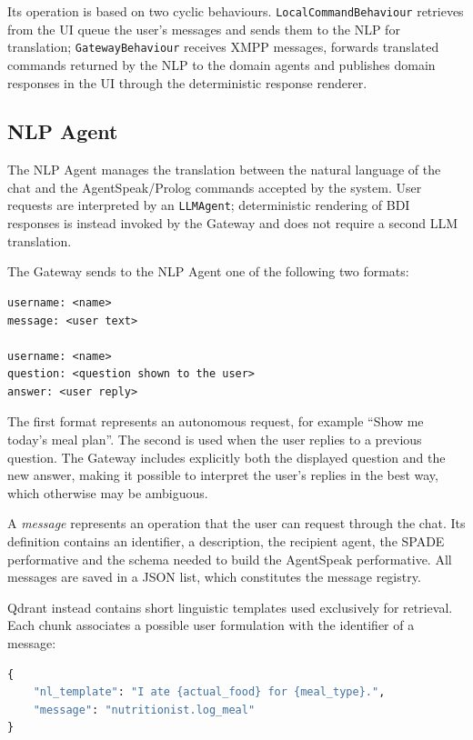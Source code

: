 \documentclass[12pt,a4paper]{article}
\begin{document}
Its operation is based on two cyclic behaviours. \texttt{LocalCommandBehaviour} retrieves from the
UI queue the user's messages and sends them to the NLP for translation; \texttt{GatewayBehaviour}
receives XMPP messages, forwards translated commands returned by the NLP to the domain agents and
publishes domain responses in the UI through the deterministic response renderer.

\subsection{NLP Agent}

The NLP Agent manages the translation between the natural language of the chat and the
AgentSpeak/Prolog commands accepted by the system. User requests are interpreted by an
\texttt{LLMAgent}; deterministic rendering of BDI responses is instead invoked by the Gateway and
does not require a second LLM translation.

The Gateway sends to the NLP Agent one of the following two formats:

\begin{lstlisting}[caption={Input formats of the NLP Agent}]
username: <name>
message: <user text>

username: <name>
question: <question shown to the user>
answer: <user reply>
\end{lstlisting}

The first format represents an autonomous request, for example ``Show me today's meal plan''.
The second is used when the user replies to a previous question. The Gateway includes
explicitly both the displayed question and the new answer, making it possible to interpret the
user's replies in the best way, which otherwise may be ambiguous.

A \emph{message} represents an operation that the user can request through the
chat. Its definition contains an identifier, a description, the recipient agent,
the SPADE performative and the schema needed to build the AgentSpeak performative.
All messages are saved in a JSON list, which constitutes the message registry.

Qdrant instead contains short linguistic templates used exclusively for retrieval. Each chunk
associates a possible user formulation with the identifier of a message:

\begin{lstlisting}[language=Python,caption={Example of indexed linguistic chunk}]
{
    "nl_template": "I ate {actual_food} for {meal_type}.",
    "message": "nutritionist.log_meal"
}
\end{lstlisting}
\end{document}
